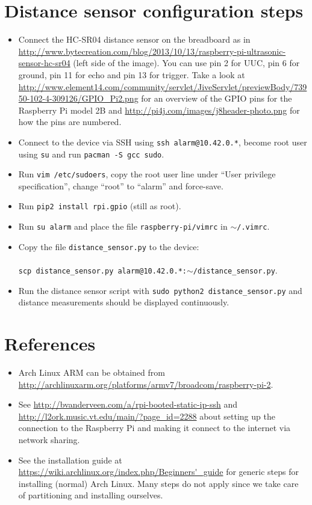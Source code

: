\documentclass{article}
\begin{document}
\section{Distance sensor configuration steps}
\begin{itemize}
    \item Connect the HC-SR04 distance sensor on the breadboard as in
          \url{http://www.bytecreation.com/blog/2013/10/13/raspberry-pi-ultrasonic-sensor-hc-sr04}
          (left side of the image). You can use pin 2 for UUC, pin 6 for
          ground, pin 11 for echo and pin 13 for trigger. Take a look at
          \url{http://www.element14.com/community/servlet/JiveServlet/previewBody/73950-102-4-309126/GPIO_Pi2.png}
          for an overview of the GPIO pins for the Raspberry Pi model 2B and
          \url{http://pi4j.com/images/j8header-photo.png} for how the pins are
          numbered.
    \item Connect to the device via SSH using {\tt ssh alarm@10.42.0.*}, become
          root user using {\tt su} and run {\tt pacman -S gcc sudo}.
    \item Run {\tt vim /etc/sudoers}, copy the root user line under ``User
          privilege specification'', change ``root'' to ``alarm'' and
          force-save.
    \item Run {\tt pip2 install rpi.gpio} (still as root).
    \item Run {\tt su alarm} and place the file {\tt raspberry-pi/vimrc} in
          {\tt $\sim$/.vimrc}.
    \item Copy the file {\tt distance\_sensor.py} to the device: \\\\
          {\tt scp distance\_sensor.py alarm@10.42.0.*:$\sim$/distance\_sensor.py}.
    \item Run the distance sensor script with {\tt sudo python2 distance\_sensor.py}
          and distance measurements should be displayed continuously.
\end{itemize}

\section{References}
\begin{itemize}
    \item Arch Linux ARM can be obtained from \url{http://archlinuxarm.org/platforms/armv7/broadcom/raspberry-pi-2}.
    \item See \url{http://bvanderveen.com/a/rpi-booted-static-ip-ssh} and 
          \url{http://l2ork.music.vt.edu/main/?page_id=2288} about setting up 
          the connection to the Raspberry Pi and making it connect to the 
          internet via network sharing.
    \item See the installation guide at 
          \url{https://wiki.archlinux.org/index.php/Beginners'_guide} for 
          generic steps for installing (normal) Arch Linux. Many steps do not 
          apply since we take care of partitioning and installing ourselves.
\end{itemize}
\end{document}
